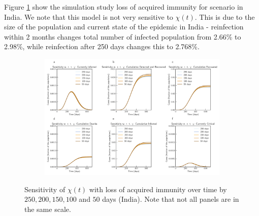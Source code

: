 \documentclass[authoryear,preprint]{elsarticle}
\begin{document}
Figure \ref{fig8} show the simulation study loss of acquired immunity for scenario in India. We note that this model is not very sensitive to $\chi(t)$.  This is due to the size of the population and current state of the epidemic in India - reinfection within 2 months changes total number of infected population from 2.66\% to 2.98\%, while reinfection after 250 days changes this to 2.768\%.

%
\begin{figure}[t!]
	\centering
	\begin{subfigure}[b]{\textwidth}
		\centering
		\includegraphics[width=1\linewidth]{India_scenario_reinfection.pdf}
	\end{subfigure}
	\caption{Sensitivity of $\chi(t)$ with loss of acquired immunity over time by $250, 200, 150, 100$ and $50$ days (India). Note that not all panels are in the same scale.}
	\label{fig8} 
\end{figure}
\end{document}
